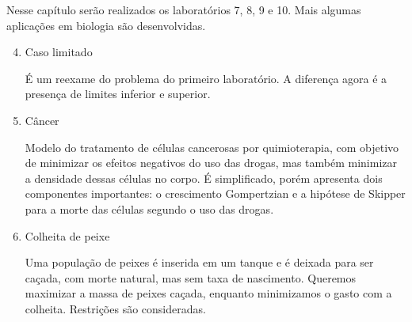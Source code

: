 Nesse capítulo serão realizados os laboratórios 7, 8, 9 e 10. Mais algumas
aplicações em biologia são desenvolvidas.

\begin{enumerate}[label=\textbf{Lab \arabic*:}]
    \setcounter{enumi}{3}

    \item Caso limitado 
    
    É um reexame do problema do primeiro laboratório. A diferença agora é a
    presença de limites inferior e superior. 

    \item Câncer
    
    Modelo do tratamento de células cancerosas por quimioterapia, com objetivo
    de minimizar os efeitos negativos do uso das drogas, mas também minimizar
    a densidade dessas células no corpo. É simplificado, porém apresenta dois
    componentes importantes: o crescimento Gompertzian e a hipótese de Skipper
    para a morte das células segundo o uso das drogas. 

    \item Colheita de peixe  
    
    Uma população de peixes é inserida em um tanque e é deixada para ser
    caçada, com morte natural, mas sem taxa de nascimento. Queremos maximizar
    a massa de peixes caçada, enquanto minimizamos o gasto com a colheita.
    Restrições são consideradas. 
 
\end{enumerate}